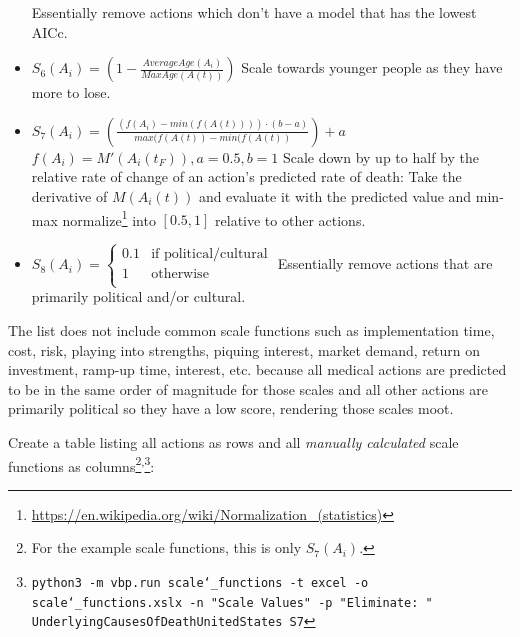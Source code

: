 \documentclass[12pt, a4paper, twocolumn]{article}
\begin{document}
\begin{itemize}
                \newline\newline
                Essentially remove actions which don't have a model that has the lowest AICc.
\item $S_6(A_i) = \left(1 - \frac{AverageAge(A_i)}{MaxAge(A(t))}\right)$
                \newline\newline
                Scale towards younger people as they have more to lose.
\item $S_7(A_i) = \left(\frac{(f(A_i)-min(f(A(t)))) \cdot (b-a)}{max(f(A(t))-min(f(A(t))}\right) + a$
                \newline\newline
                $f(A_i) = M'(A_i(t_F)), a=0.5, b=1$
                \newline\newline
                Scale down by up to half by the relative rate of change of an action's predicted rate of death: Take the derivative of $M(A_i(t))$ and evaluate it with the predicted value and min-max normalize\footnote{\url{https://en.wikipedia.org/wiki/Normalization_(statistics)}} into $[0.5,1]$ relative to other actions.
\item $S_8(A_i) = \begin{cases}\text{0.1} & \mbox{if political/cultural} \\ \text{1} & \mbox{otherwise} \\ \end{cases}$
                \newline\newline
                Essentially remove actions that are primarily political and/or cultural.
\end{itemize}

The list does not include common scale functions such as implementation time, cost, risk, playing into strengths, piquing interest, market demand, return on investment, ramp-up time, interest, etc. because all medical actions are predicted to be in the same order of magnitude for those scales and all other actions are primarily political so they have a low score, rendering those scales moot.

Create a table listing all actions as rows and all \textit{manually calculated} scale functions as columns\footnote{For the example scale functions, this is only $S_7(A_i)$.}\textsuperscript{,}\footnote{\texttt{python3 -m vbp.run scale\char`_functions -t excel -o scale\char`_functions.xslx -n "Scale Values" -p "Eliminate: " UnderlyingCausesOfDeathUnitedStates S7}}:
\end{document}
